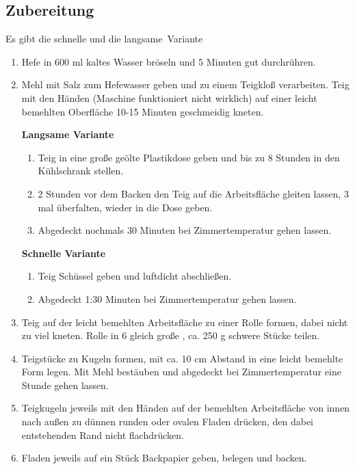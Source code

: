 \documentclass[10pt,a4paper,ngerman, DIV=16]{scrartcl}
\begin{document}
\subsection*{Zubereitung}

Es gibt die schnelle und die \glqq langsame\grqq\ Variante
\begin{enumerate}
    \item Hefe in 600 ml kaltes Wasser bröseln und 5 Minuten gut durchrühren.
    \item Mehl mit Salz zum Hefewasser geben und zu einem Teigkloß verarbeiten. Teig mit den Händen (Maschine funktioniert nicht wirklich) auf einer leicht bemehlten Oberfläche 10-15 Minuten geschmeidig kneten.
    
    {\large \textbf{Langsame Variante}}
    \begin{enumerate}
        \item Teig in eine große geölte Plastikdose geben und bis zu 8 Stunden in den Kühlschrank stellen. 
        \item 2 Stunden vor dem Backen den Teig auf die Arbeitsfläche gleiten lassen, 3 mal überfalten, wieder in die Dose geben.
        \item Abgedeckt nochmals 30 Minuten bei Zimmertemperatur gehen lassen. 
    \end{enumerate}
    
    {\large \textbf{Schnelle Variante}}
    \begin{enumerate}
        \item Teig Schüssel geben und luftdicht abschließen.
        \item Abgedeckt 1:30 Minuten bei Zimmertemperatur gehen lassen. 
    \end{enumerate}
    
    \item Teig auf der leicht bemehlten Arbeitsfläche zu einer Rolle formen, dabei nicht zu viel kneten. Rolle in 6 gleich große , ca. 250 g schwere Stücke teilen.
    \item Teigstücke zu Kugeln formen, mit ca. 10 cm Abstand in eine leicht bemehlte Form legen. Mit Mehl bestäuben und abgedeckt bei Zimmertemperatur eine Stunde gehen lassen.
    \item Teigkugeln jeweils mit den Händen auf der bemehlten Arbeitsfläche von innen nach außen zu dünnen runden oder ovalen Fladen drücken, den dabei entstehenden Rand nicht flachdrücken.
    \item Fladen jeweils auf ein Stück Backpapier geben, belegen und backen.
\end{enumerate}






\listoffigures
\printglossary[title=Glossar]
\printindex
\printbibliography 
\end{document}
